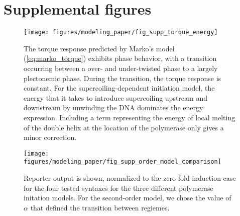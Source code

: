 \documentclass[11pt]{article}
\begin{document}
\section{Supplemental figures}
\FloatBarrier
\begin{figure}[htbp]
    \centering
    {\texttt{[image: figures/modeling\_paper/fig\_supp\_torque\_energy]}
    \label{fig:supp:torque_diagram}
    \label{fig:supp:energy_with_melting}
    }
    \caption{
         The torque response predicted by Marko's model (\cref{eq:marko_torque}) exhibits phase behavior, with a transition occurring between a over- and under-twisted phase to a largely plectonemic phase. During the transition, the torque response is constant.
         For the supercoiling-dependent initiation model, the energy that it takes to introduce supercoiling upstream and downstream by unwinding the DNA dominates the energy expression. Including a term representing the energy of local melting of the double helix at the location of the polymerase only gives a minor correction.
    }
    \label{fig:top:supp_torque_energy}
\end{figure}

\begin{figure}[htbp]
    \centering
    {\texttt{[image: figures/modeling\_paper/fig\_supp\_order\_model\_comparison]}
    \label{fig:supp:initation_order_comparison}
    \label{fig:supp:alpha_reporter_counts}
    }
    \caption{
         Reporter output is shown, normalized to the zero-fold induction case for the four tested syntaxes for the three different polymerase initation models.
         For the second-order model, we chose the value of \(\alpha\) that defined the transition between regiemes.
    }
    \label{fig:top:supp_model_comparison}
\end{figure}
\end{document}
